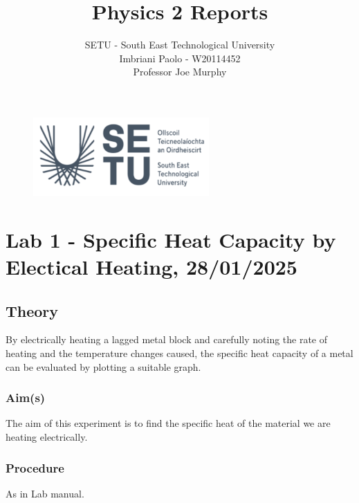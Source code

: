 \documentclass[a4paper]{article}
\title{Physics 2 Reports}
\author{SETU - South East Technological University\\Imbriani Paolo - W20114452\\Professor Joe Murphy}
\begin{document}
\begin{figure}
    \centering
    \includegraphics[width=0.6\textwidth]{SETU.png}
    \label{fig:centered-image}
\end{figure}

\maketitle 

\pagebreak

\tableofcontents

\pagebreak

\section{Lab 1 -  Specific Heat Capacity by Electical Heating, 28/01/2025}

\subsection{Theory}

By electrically heating a lagged metal block and carefully noting the rate of heating 
and the temperature changes caused, the specific heat capacity of a metal can be evaluated
by plotting a suitable graph.

\subsubsection{Aim(s)}

The aim of this experiment is to find the specific heat of the material we are heating electrically.

\subsubsection{Procedure}

As in Lab manual.
\end{document}
